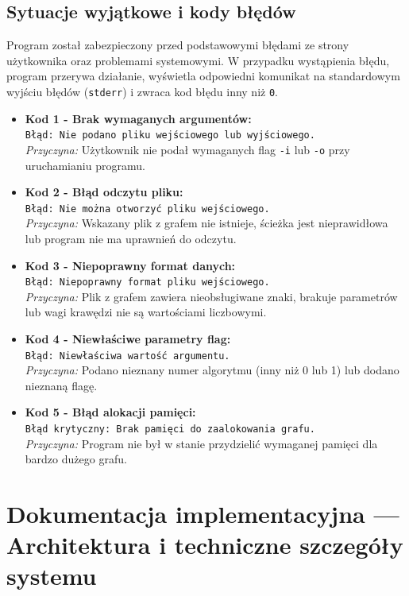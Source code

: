 \documentclass[12pt,a4paper]{article}
\begin{document}
\subsection{Sytuacje wyjątkowe i kody błędów}
Program został zabezpieczony przed podstawowymi błędami ze strony użytkownika oraz problemami systemowymi. W przypadku wystąpienia błędu, program przerywa działanie, wyświetla odpowiedni komunikat na standardowym wyjściu błędów (\texttt{stderr}) i zwraca kod błędu inny niż \texttt{0}.

\begin{itemize}
    \item \textbf{Kod 1 - Brak wymaganych argumentów:} \\
    \texttt{Błąd: Nie podano pliku wejściowego lub wyjściowego.} \\
    \textit{Przyczyna:} Użytkownik nie podał wymaganych flag \texttt{-i} lub \texttt{-o} przy uruchamianiu programu.
    
    \item \textbf{Kod 2 - Błąd odczytu pliku:} \\
    \texttt{Błąd: Nie można otworzyć pliku wejściowego.} \\
    \textit{Przyczyna:} Wskazany plik z grafem nie istnieje, ścieżka jest nieprawidłowa lub program nie ma uprawnień do odczytu.
    
    \item \textbf{Kod 3 - Niepoprawny format danych:} \\
    \texttt{Błąd: Niepoprawny format pliku wejściowego.} \\
    \textit{Przyczyna:} Plik z grafem zawiera nieobsługiwane znaki, brakuje parametrów lub wagi krawędzi nie są wartościami liczbowymi.
    
    \item \textbf{Kod 4 - Niewłaściwe parametry flag:} \\
    \texttt{Błąd: Niewłaściwa wartość argumentu.} \\
    \textit{Przyczyna:} Podano nieznany numer algorytmu (inny niż 0 lub 1) lub dodano nieznaną flagę.
    
    \item \textbf{Kod 5 - Błąd alokacji pamięci:} \\
    \texttt{Błąd krytyczny: Brak pamięci do zaalokowania grafu.} \\
    \textit{Przyczyna:} Program nie był w stanie przydzielić wymaganej pamięci dla bardzo dużego grafu.
\end{itemize}
\section{Dokumentacja implementacyjna — Architektura i techniczne szczegóły systemu}
\end{document}
